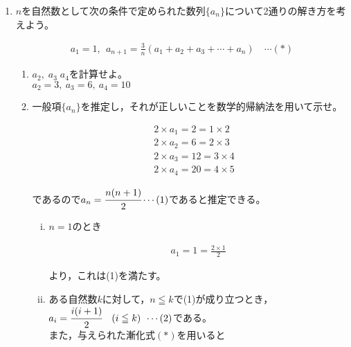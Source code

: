 \documentclass[autodetect-engine,ja=standard, 10.5pt, a4paper, titlepage]{bxjsarticle}
\begin{document}
\begin{enumerate}[1.]
  \item
  $n$を自然数として次の条件で定められた数列$\{a_n\}$について2通りの解き方を考えよう。 %

    \begin{align*}
      a_1 = 1,\:\: a_{n+1} = \frac{3}{n} (a_1 + a_2 + a_3 + \cdots + a_n)  \quad\cdots (*)
    \end{align*}

  \begin{enumerate}[(1)]
    \item $a_2,\;a_3\;a_4$を計算せよ。\\
          $a_2 = 3,\: a_3 = 6,\:a_4 = 10$
\baselineskip
    \item 一般項$\{a_n\}$を推定し，それが正しいことを数学的帰納法を用いて示せ。\\
            \begin{fleqn}[20pt]
              \begin{align*}
                &2\times a_1 = 2 = 1\times 2\\
                &2\times a_2 = 6 = 2\times 3 \\
                &2\times a_3 = 12 = 3\times 4 \\
                &2\times a_4 = 20 = 4\times 5
              \end{align*}
            \end{fleqn}
          であるので$a_n = \cfrac{n(n+1)}{2}\cdots (1)$であると推定できる。 \\
          \begin{enumerate}[(i)]
            \item $n = 1$のとき
                    \begin{fleqn}[20pt]
                      \begin{align*}
                        a_1 = 1 = \frac{2\times 1}{2}
                      \end{align*}
                    \end{fleqn}
                  より，これは(1)を満たす。
            \item ある自然数$k$に対して，$n \leqq k$で(1)が成り立つとき，
                  $a_i = \cfrac{i(i+1)}{2}\quad(i\leqq k) \:\: \cdots (2)$である。\\
                  また，与えられた漸化式$(*)$を用いると
                    \begin{fleqn}[20pt]

\end{fleqn}
\end{enumerate}
\end{enumerate}
\end{enumerate}
\end{document}
